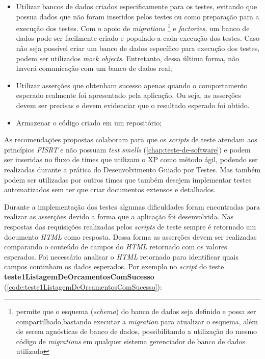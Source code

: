 \begin{itemize}
        \item Utilizar bancos de dados criados especificamente para os testes, evitando que possua dados que não foram inseridos pelos testes ou como preparação para a execução dos testes. Com o apoio de \emph{migrations} \footnote{permite que o esquema (\emph{schema}) do banco de dados seja definido e possa ser compartilhado,bastando executar a \emph{migration} para atualizar o esquema, além de serem agnósticas de banco de dados, possibilitando a utilização do mesmo código de \emph{migrations} em qualquer sistema gerenciador de banco de dados utilizado} e \emph{factories}, um banco de dados pode ser facilmente criado e populado a cada execução dos testes. Caso não seja possível criar um banco de dados específico para execução dos testes, podem ser utilizados \emph{mock objects}. Entretanto, dessa última forma, não haverá comunicação com um banco de dados real;
        \item Utilizar asserções que obtenham sucesso apenas quando o comportamento esperado realmente foi apresentado pela aplicação. Ou seja, as asserções devem ser precisas e devem evidenciar que o resultado esperado foi obtido.
        \item Armazenar o código criado em um repositório;
    \end{itemize}
    
    As recomendações propostas colaboram para que os \emph{scripts} de teste atendam aos princípios \emph{FISRT} e não possuam \emph{test smells} (\autoref{chap:teste-de-software}) e podem ser inseridas no fluxo de times que utilizam o XP como método ágil, podendo ser realizadas durante a prática do Desenvolvimento Guiado por Testes. Mas também podem ser utilizadas por outros times que também desejem implementar testes automatizados sem ter que criar documentos extensos e detalhados.
    
    Durante a implementação dos testes algumas dificuldades foram encontradas para realizar as asserções devido a forma que a aplicação foi desenvolvida. Nas respostas das requisições realizadas pelos \emph{scripts} de teste sempre é retornado um documento \emph{HTML} como resposta. Dessa forma as asserções devem ser realizadas comparando o conteúdo de campos do \emph{HTML} retornado com os valores esperados. Foi necessário analisar o \emph{HTML} retornado para identificar quais campos continham os dados esperados. Por exemplo no \emph{script} do teste \textbf{teste1ListagemDeOrcamentosComSucesso}  (\autoref{code:teste1ListagemDeOrcamentosComSucesso}):
    
